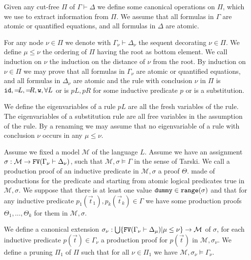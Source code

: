 \documentclass[a4paper,12pt]{article}
\newcommand{\setM}              { {\mathcal M} }
\newcommand{\FV}              { {\tt FV} }
\newcommand{\id}              { {\tt id} }
\newcommand{\range}           { {\tt range} }
\newcommand{\dummy}           { {\tt dummy} }
\newcommand{\eqL}     {= \! \!  \!  L}
\newcommand{\eqR}    {= \! \!  \!  R}
\newcommand{\Weak} { {\tt w} }
\begin{document}
Given any cut-free $\Pi$ of $\Gamma \vdash \Delta$ we define some canonical operations on $\Pi$, which we use to extract information from $\Pi$. We assume that all formulas in $\Gamma$ are atomic or quantified equations, and all formulas in $\Delta$ are atomic.


For any node $\nu \in \Pi$ we denote with $\Gamma_\nu \vdash \Delta_\nu$ the sequent decorating $\nu \in \Pi$. We define $\mu \le \nu$ the ordering of $\Pi$ having the root as bottom element. We call induction on $\nu$ the induction on the distance of $\nu$ from the root. By induction on $\nu \in \Pi$ we may prove that  all formulas in $\Gamma_\nu$ are atomic or quantified equations, and all formulas in $\Delta_\nu$ are atomic and the rule with conclusion $\nu$ in $\Pi$ is $\id, \eqL, \eqR, \Weak, \forall L$ or is $p L, p R$ for some inductive predicate $p$ or is a substitution. 

We define the eigenvariables of a rule $p L$ are all the fresh variables of the rule. The eigenvariables of a substitution rule are all free variables in the assumption of the rule.
By a renaming we may assume that no eigenvariable of a rule with conclusion $\nu$ occurs in any $\mu \le \nu$. 

Assume we fixed a model $\setM$ of the language $L$. Assume we have an assignment $\sigma:\setM \rightarrow \FV(\Gamma_\nu \vdash \Delta_\nu)$, such that $\setM, \sigma \models\Gamma$ in the sense of Tarski. We call a production proof of an inductive predicate in $\setM, \sigma$ a proof $\Theta$. made of productions for the predicate and starting from atomic logical predicates true in $\setM, \sigma$.  We suppose that there is at least one value $\dummy \in \range(\sigma)$ and that for any inductive predicate $p_1(\vec{t}_1), p_k(\vec{t}_k) \in \Gamma$ we have some production proofs $\Theta_1, \ldots, \Theta_k$ for them in $\setM, \sigma$. 

We define a canonical extension $\sigma_\nu:\bigcup\{\FV(\Gamma_\nu \vdash \Delta_\mu) | \mu \le \nu\}\rightarrow \setM$ of $\sigma$, for each inductive predicate $p(\vec{t}) \in \Gamma_\nu$ a production proof for $p(\vec{t})$ in $\setM, \sigma_\nu$. 
We define a pruning $\Pi_1$ of $\Pi$ such that for all $\nu \in \Pi_1$ we have $\setM, \sigma_\nu \models \Gamma_\nu$.
\end{document}
